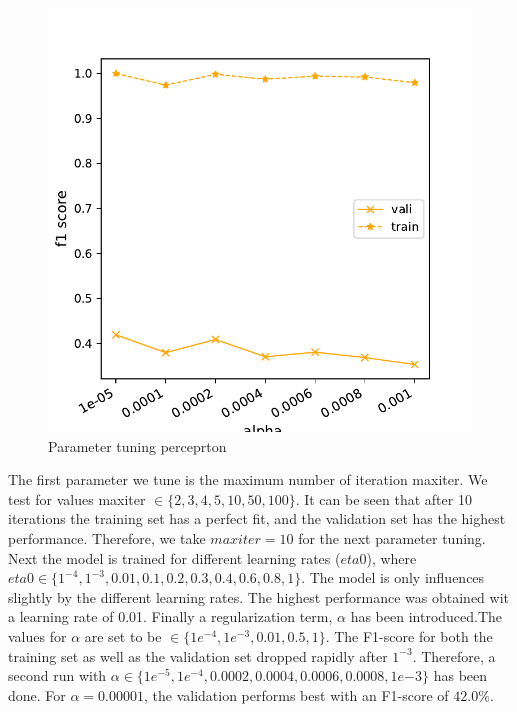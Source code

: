 \documentclass[11pt]{article}
\begin{document}
\begin{figure}[t]
\begin{minipage}[t]{0.33\textwidth}
\end{minipage}
\begin{minipage}[t]{0.33\textwidth}
\includegraphics[width=1\linewidth]{amazon/Per_alpha2.pdf}
\end{minipage}
\caption{Parameter tuning perceprton}
\label{Fig::Perceptron parameter tuning}
\end{figure}
%
The first parameter we tune is the maximum number of iteration maxiter. We test for values  maxiter $\in \{2, 3, 4, 5, 10, 50, 100\}$. It can be seen that after 10 iterations the training set has a perfect fit, and the validation set has the highest performance. Therefore, we take $maxiter=10$ for the next parameter tuning.
\newline
Next the model is trained for different learning rates ($eta0$), where $ eta0 \in \{1^{-4}, 1^{-3}, 0.01, 0.1, 0.2, 0.3, 0.4, 0.6, 0.8, 1\}$. The model is only influences slightly by the different learning rates. The highest performance was obtained wit a learning rate of 0.01. 
\newline
Finally a regularization term, $\alpha$ has been introduced.The values for $\alpha$ are set to be $ \in \{ 1e^{-4}, 1e^{-3}, 0.01, 0.5, 1\}$. The F1-score for both the training set as well as the validation set dropped rapidly after $1^{-3}$. Therefore, a second run with $\alpha \in  \{1e^{-5}, 1e^{-4}, 0.0002, 0.0004, 0.0006, 0.0008, 1e{-3}\}$ has been done. For $\alpha=0.00001$, the validation performs best with an F1-score of $42.0\%$. 
\end{document}

